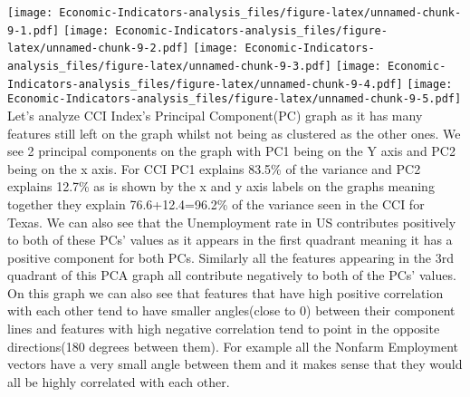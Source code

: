 \documentclass[
]{article}
\begin{document}
\texttt{[image: Economic-Indicators-analysis\_files/figure-latex/unnamed-chunk-9-1.pdf]}
\texttt{[image: Economic-Indicators-analysis\_files/figure-latex/unnamed-chunk-9-2.pdf]}
\texttt{[image: Economic-Indicators-analysis\_files/figure-latex/unnamed-chunk-9-3.pdf]}
\texttt{[image: Economic-Indicators-analysis\_files/figure-latex/unnamed-chunk-9-4.pdf]}
\texttt{[image: Economic-Indicators-analysis\_files/figure-latex/unnamed-chunk-9-5.pdf]}
Let's analyze CCI Index's Principal Component(PC) graph as it has many
features still left on the graph whilst not being as clustered as the
other ones. We see 2 principal components on the graph with PC1 being on
the Y axis and PC2 being on the x axis. For CCI PC1 explains 83.5\% of
the variance and PC2 explains 12.7\% as is shown by the x and y axis
labels on the graphs meaning together they explain 76.6+12.4=96.2\% of
the variance seen in the CCI for Texas. We can also see that the
Unemployment rate in US contributes positively to both of these PCs'
values as it appears in the first quadrant meaning it has a positive
component for both PCs. Similarly all the features appearing in the 3rd
quadrant of this PCA graph all contribute negatively to both of the PCs'
values. On this graph we can also see that features that have high
positive correlation with each other tend to have smaller angles(close
to 0) between their component lines and features with high negative
correlation tend to point in the opposite directions(180 degrees between
them). For example all the Nonfarm Employment vectors have a very small
angle between them and it makes sense that they would all be highly
correlated with each other.
\end{document}
